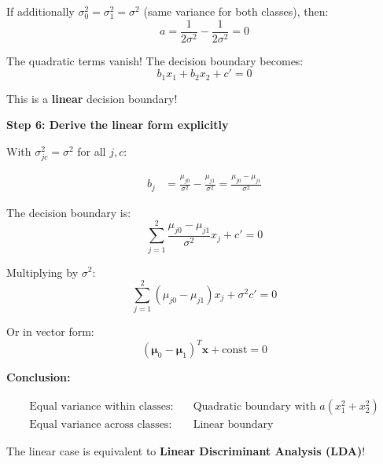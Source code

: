\documentclass[12pt]{article}
\begin{document}
\begin{solution}
If additionally $\sigma_0^2 = \sigma_1^2 = \sigma^2$ (same variance for both classes), then:
\[
a = \frac{1}{2\sigma^2} - \frac{1}{2\sigma^2} = 0
\]

The quadratic terms vanish! The decision boundary becomes:
\[
\boxed{b_1 x_1 + b_2 x_2 + c' = 0}
\]

This is a \textbf{linear} decision boundary!

\textbf{Step 6: Derive the linear form explicitly}

With $\sigma_{jc}^2 = \sigma^2$ for all $j, c$:

\begin{align}
b_j &= \frac{\mu_{j0}}{\sigma^2} - \frac{\mu_{j1}}{\sigma^2} = \frac{\mu_{j0} - \mu_{j1}}{\sigma^2}
\end{align}

The decision boundary is:
\[
\sum_{j=1}^{2} \frac{\mu_{j0} - \mu_{j1}}{\sigma^2} x_j + c' = 0
\]

Multiplying by $\sigma^2$:
\[
\sum_{j=1}^{2} (\mu_{j0} - \mu_{j1}) x_j + \sigma^2 c' = 0
\]

Or in vector form:
\[
(\boldsymbol{\mu}_0 - \boldsymbol{\mu}_1)^T \mathbf{x} + \text{const} = 0
\]

\textbf{Conclusion:}

\[
\boxed{
\begin{aligned}
\text{Equal variance within classes:} &\quad \text{Quadratic boundary with } a(x_1^2 + x_2^2) \\
\text{Equal variance across classes:} &\quad \text{Linear boundary}
\end{aligned}
}
\]

The linear case is equivalent to \textbf{Linear Discriminant Analysis (LDA)}!
\end{solution}
\end{document}
